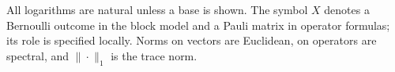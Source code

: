 \documentclass[11pt,a4paper]{article}
\theoremstyle{definition}
\theoremstyle{remark}
\numberwithin{equation}{section}
\begin{document}
All logarithms are natural unless a base is shown. The symbol $X$ denotes
a Bernoulli outcome in the block model and a Pauli matrix in operator
formulas; its role is specified locally. Norms on vectors are Euclidean,
on operators are spectral, and $\|\cdot\|_1$ is the trace norm.


\begingroup\small
{}

\endgroup
\end{document}

